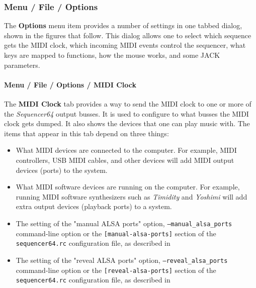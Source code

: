 \subsubsection{Menu / File / Options}
\label{subsubsec:seq64_menu_file_options}

   The \textbf{Options} menu item provides a number of settings in one
   tabbed dialog, shown in the figures that follow.
   This dialog allows one to select which sequence gets the MIDI
   clock, which incoming MIDI events control the sequencer, what keys are
   mapped to functions, how the mouse works, and some JACK parameters.

\paragraph{Menu / File / Options / MIDI Clock}
\label{paragraph:seq64_menu_file_options_midi_clock}

   The \textbf{MIDI Clock} tab provides a way to send the MIDI clock to one
   or more of the \textsl{Sequencer64} output busses.
   It is used to configure to what busses the MIDI clock gets dumped.
   It also shows the devices that one can play music with.
   The items that appear in this tab depend on three things:

   \begin{itemize}
      \item What MIDI devices are connected to the computer.  For example,
         MIDI controllers, USB MIDI cables, and other devices will add MIDI
         output devices (ports) to the system.
      \item What MIDI software devices are running on the computer.
         For example, running MIDI software synthesizers such as
         \textsl{Timidity} and \textsl{Yoshimi} will add extra output devices
         (playback ports) to a system.
      \item The setting of the "manual ALSA ports" option,
         \texttt{--manual\_alsa\_ports} command-line option or the
         \texttt{[manual-alsa-ports]} section of the
         \texttt{sequencer64.rc} configuration file, as described in
      \item The setting of the "reveal ALSA ports" option,
         \texttt{--reveal\_alsa\_ports} command-line option or the
         \texttt{[reveal-alsa-ports]} section of the
         \texttt{sequencer64.rc} configuration file, as described in
   \end{itemize}

